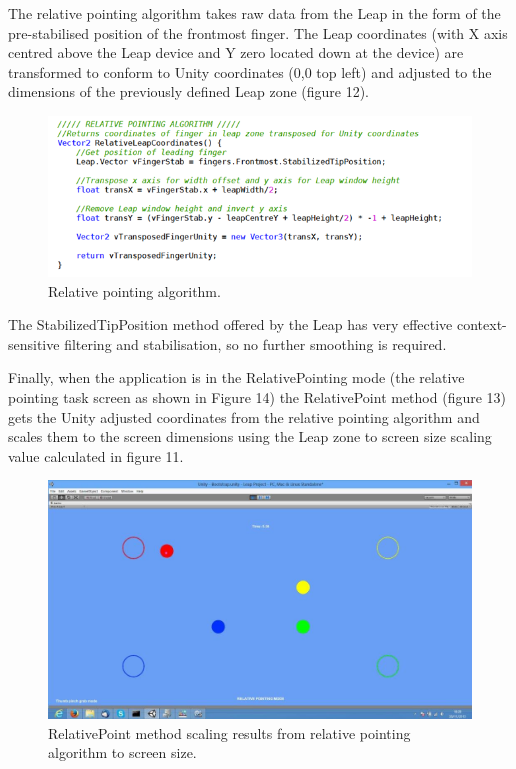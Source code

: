 \documentclass[titlepage]{article}
\begin{document}
The relative pointing algorithm takes raw data from the Leap in the form of the pre-stabilised position of the frontmost finger. The Leap coordinates (with X axis centred above the Leap device and Y zero located down at the device) are transformed to conform to Unity coordinates (0,0 top left) and adjusted to the dimensions of the previously defined Leap zone (figure 12).

\begin{figure}[!h]
    \centering
    \includegraphics[width=7.0in]{Figure_11}
    \caption{Relative pointing algorithm.}
\end{figure}
 
The StabilizedTipPosition method offered by the Leap has very effective context-sensitive filtering and stabilisation, so no further smoothing is required.

Finally, when the application is in the RelativePointing mode (the relative pointing task screen as shown in Figure 14) the RelativePoint method (figure 13) gets the Unity adjusted coordinates from the  relative pointing algorithm and scales them to the screen dimensions using the Leap zone to screen size scaling value calculated in figure 11.

\begin{figure}[!h]
    \centering
    \includegraphics[width=7.0in]{Figure_13}
    \caption{RelativePoint method scaling results from relative pointing algorithm to screen size.}
\end{figure}
\end{document}
